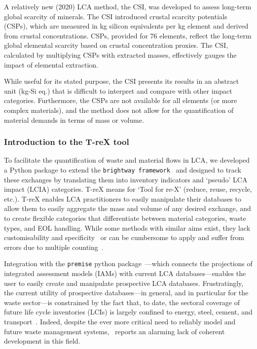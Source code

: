 A relatively new (2020) LCA method, the CSI, was developed to assess long-term global scarcity of minerals. The CSI introduced crustal scarcity potentials (CSPs), which are measured in kg silicon equivalents per kg element and derived from crustal concentrations. CSPs, provided for 76 elements, reflect the long-term global elemental scarcity based on crustal concentration proxies. The CSI, calculated by multiplying CSPs with extracted masses, effectively gauges the impact of elemental extraction. 

While useful for its stated purpose, the CSI presents its results in an abstract unit (kg-Si eq.) that is difficult to interpret and compare with other impact categories. Furthermore, the CSPs are not available for all elements (or more complex materials), and the method does not allow for the quantification of material demands in terms of mass or volume.

\subsubsection{Introduction to the T-reX tool}

To facilitate the quantification of waste and material flows in LCA, we developed a Python package to extend the \texttt{brightway framework}~\citep{mutel2017brightway} and designed to track these exchanges by translating them into inventory indicators and `pseudo' LCA impact (LCIA) categories. T-reX means for `Tool for re-X' (reduce, reuse, recycle, etc.).  T-reX enables LCA practitioners to easily manipulate their databases to allow them to easily aggregate the mass and volume of any desired exchange, and to create flexible categories that differentiate between material categories, waste types, and EOL handling. While some methods with similar aims exist, they lack customisability and specificity~\citep{foen2021ecofactors} or can be cumbersome to apply and suffer from errors due to multiple counting~\citep{laurenti2023wastefootprint}.


Integration with the \texttt{premise} python package~\citep{sacchi2022premise}---which connects the projections of integrated assessment models (IAMs) with current LCA databases---enables the user to easily create and manipulate prospective LCA databases. Frustratingly, the current utility of prospective databases---in general, and in particular for the waste sector---is constrained by the fact that, to date, the sectoral coverage of future life cycle inventories (LCIs) is largely confined to energy, steel, cement, and transport~\citep{sacchi2023premisedocs}. Indeed, despite the ever more critical need to reliably model and future waste management systems,~\cite{bisinella2024wastelca} reports an alarming lack of coherent development in this field. 


